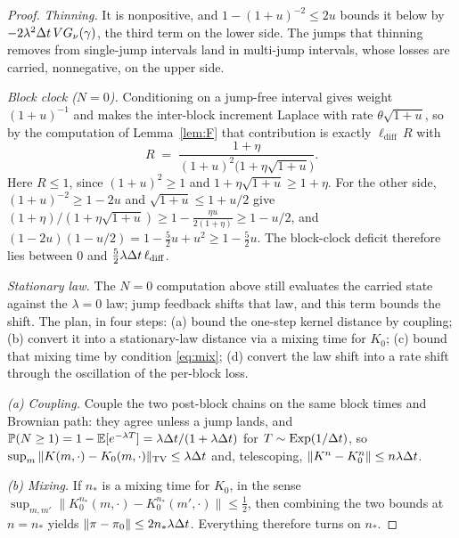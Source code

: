 \begin{proof}
\emph{Thinning.} It is nonpositive, and $1-(1+u)^{-2}\le2u$ bounds it below by $-2\lambda^2\Delta t\,VG_\nu(\gamma)$, the third term on the lower side. The jumps that thinning removes from single-jump intervals land in multi-jump intervals, whose losses are carried, nonnegative, on the upper side.

\emph{Block clock ($N=0$).} Conditioning on a jump-free interval gives weight $(1+u)^{-1}$ and makes the inter-block increment Laplace with rate $\theta\sqrt{1+u}$, so by the computation of Lemma~\ref{lem:F} that contribution is exactly $\ell_{\mathrm{diff}}\,R$ with
\[
R \;=\; \frac{1+\eta}{(1+u)^2\big(1+\eta\sqrt{1+u}\big)}.
\]
Here $R\le1$, since $(1+u)^2\ge1$ and $1+\eta\sqrt{1+u}\ge1+\eta$. For the other side, $(1+u)^{-2}\ge1-2u$ and $\sqrt{1+u}\le1+u/2$ give $(1+\eta)/(1+\eta\sqrt{1+u})\ge1-\tfrac{\eta u}{2(1+\eta)}\ge1-u/2$, and $(1-2u)(1-u/2)=1-\tfrac52u+u^2\ge1-\tfrac52u$. The block-clock deficit therefore lies between $0$ and $\tfrac52\lambda\Delta t\,\ell_{\mathrm{diff}}$.

\emph{Stationary law.} The $N=0$ computation above still evaluates the carried state against the $\lambda=0$ law; jump feedback shifts that law, and this term bounds the shift. The plan, in four steps: (a) bound the one-step kernel distance by coupling; (b) convert it into a stationary-law distance via a mixing time for $K_0$; (c) bound that mixing time by condition \eqref{eq:mix}; (d) convert the law shift into a rate shift through the oscillation of the per-block loss.

\emph{(a) Coupling.} Couple the two post-block chains on the same block times and Brownian path: they agree unless a jump lands, and $\mathbb{P}(N\ge1)=1-\mathbb{E}[e^{-\lambda T}]=\lambda\Delta t/(1+\lambda\Delta t)$ for $T\sim\mathrm{Exp}(1/\Delta t)$, so $\sup_m\|K(m,\cdot)-K_0(m,\cdot)\|_{\mathrm{TV}}\le\lambda\Delta t$ and, telescoping, $\|K^n-K_0^n\|\le n\lambda\Delta t$.

\emph{(b) Mixing.} If $n_*$ is a mixing time for $K_0$, in the sense $\sup_{m,m'}\|K_0^{n_*}(m,\cdot)-K_0^{n_*}(m',\cdot)\|\le\tfrac12$, then combining the two bounds at $n=n_*$ yields $\|\pi-\pi_0\|\le2n_*\lambda\Delta t$. Everything therefore turns on $n_*$.


\end{proof}
